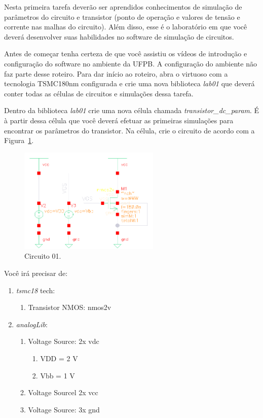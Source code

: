 Nesta primeira tarefa deverão ser aprendidos conhecimentos de simulação de parâmetros do circuito e transistor (ponto de operação e valores de tensão e corrente nas malhas do circuito). Além disso, esse é o laboratório em que você deverá desenvolver suas habilidades no software de simulação de circuitos.

Antes de começar tenha certeza de que você assistiu os vídeos de introdução e configuração do software no ambiente da UFPB. A configuração do ambiente não faz parte desse roteiro. Para dar início ao roteiro, abra o virtuoso com a tecnologia TSMC180nm configurada e crie uma nova biblioteca {\em lab01} que deverá conter todas as células de circuitos e simulações dessa tarefa.

Dentro da biblioteca {\em lab01} crie uma nova célula chamada {\em transistor\_dc\_param}. É à partir dessa célula que você deverá efetuar as primeiras simulações para encontrar os parâmetros do transistor. Na célula, crie o circuito de acordo com a Figura~\ref{circuito}.
\begin{figure}[hbt!]
  \centering
    \includegraphics[width=0.6\textwidth]{transistor_dc_sim.png}
    \caption{Circuito 01.\label{circuito}}
\end{figure}

\newpage
Você irá precisar de:
\begin{enumerate}
    \item {\em tsmc18} tech:
    \begin{enumerate}
        \item Transistor NMOS: nmos2v
    \end{enumerate}
    \item {\em analogLib}:
    \begin{enumerate}
        \item Voltage Source: 2x vdc
        \begin{enumerate}
            \item VDD = 2 V
            \item Vbb = 1 V
        \end{enumerate}
        \item Voltage Sourcel 2x vcc
        \item Voltage Source: 3x gnd
    \end{enumerate}
\end{enumerate}


